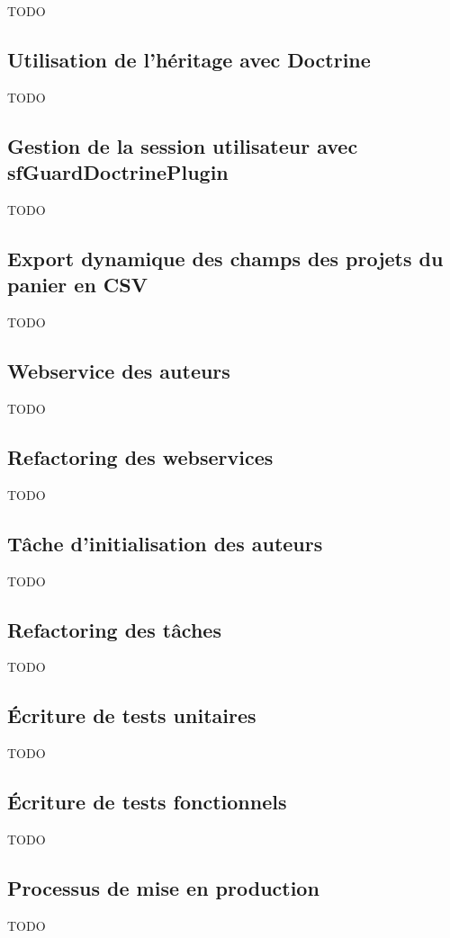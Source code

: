 TODO

\subsection{Utilisation de l'héritage avec Doctrine}

TODO

\subsection{Gestion de la session utilisateur avec sfGuardDoctrinePlugin}

TODO

\subsection{Export dynamique des champs des projets du panier en CSV}

TODO

\subsection{Webservice des auteurs}

TODO

\subsection{Refactoring des webservices}

TODO

\subsection{Tâche d'initialisation des auteurs}

TODO

\subsection{Refactoring des tâches}

TODO

\subsection{Écriture de tests unitaires}

TODO

\subsection{Écriture de tests fonctionnels}

TODO

\subsection{Processus de mise en production}

TODO

